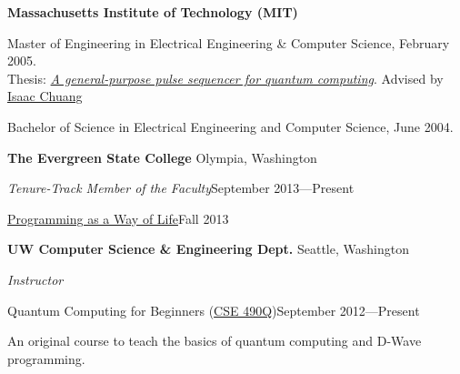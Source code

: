 \documentclass[letter]{article}
\begin{document}
{\bf Massachusetts Institute of Technology (MIT)}
\par
Master of Engineering in Electrical Engineering \& Computer Science, February 2005.\\
Thesis: \href{http://sourceforge.net/project/showfiles.php?group_id=129764&package_id=144780&release_id=307201}{\emph{A general-purpose pulse sequencer for quantum computing}}.
Advised by \href{http://feynman.mit.edu/ike/homepage/index.html}{Isaac Chuang}\\
\par
Bachelor of Science in Electrical Engineering and Computer Science, June 2004.\\
\vspace{\baselineskip}
\par


{\bf The Evergreen State College} \hfill Olympia, Washington
\vspace{0.5\baselineskip}
\par
{\em Tenure-Track Member of the Faculty}\hfill September 2013---Present

\vspace{0.5\baselineskip}
\par
\href{http://ada.evergreen.edu/csf/python13f/}{Programming as a Way of Life}\hfill Fall 2013

\vspace{0.5\baselineskip}
\par

{\bf UW Computer Science \& Engineering Dept.} \hfill Seattle, Washington
\vspace{0.5\baselineskip}
\par
{\em Instructor}

\vspace{0.5\baselineskip}
\par
Quantum Computing for Beginners (\href{http://www.cs.washington.edu/education/courses/490q/12au/}{CSE 490Q})\hfill September 2012---Present
\par
An original course to teach the basics of quantum computing and D-Wave programming.
\end{document}
